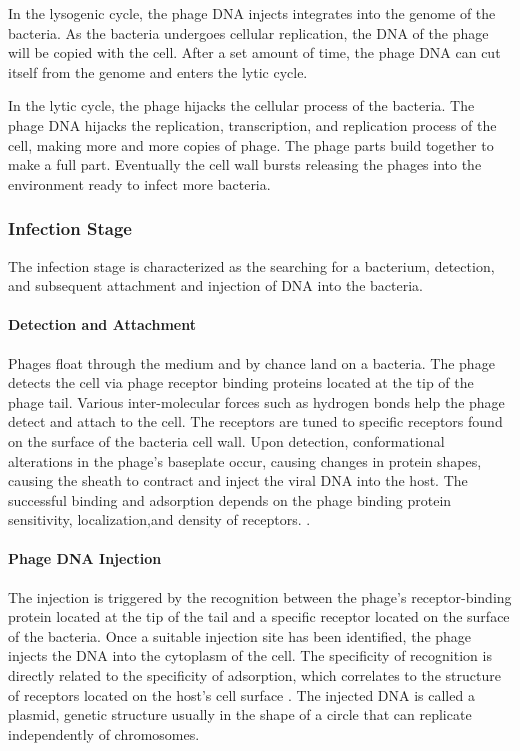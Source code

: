 In the lysogenic cycle, the phage DNA injects integrates into the genome of the bacteria. 
As the bacteria undergoes cellular replication, the DNA of the phage will be copied with the cell. 
After a set amount of time, the phage DNA can cut itself from the genome and enters the lytic cycle.
\newline 

In the lytic cycle, the phage hijacks the cellular process of the bacteria. 
The phage DNA hijacks the replication, transcription, and replication process of the cell, making more and more copies of phage. 
The phage parts build together to make a full part. 
Eventually the cell wall bursts releasing the phages into the environment ready to infect more bacteria. 

\subsubsection{Infection Stage}
The infection stage is characterized as the searching for a bacterium, detection, and subsequent attachment and injection of DNA into the bacteria. 
\paragraph{Detection and Attachment}
Phages float through the medium and by chance land on a bacteria. The phage detects the cell via phage receptor binding proteins located at the tip of the phage tail. 
Various inter-molecular forces such as hydrogen bonds help the phage detect and attach to the cell. 
The receptors are tuned to specific receptors found on the surface of the bacteria cell wall. 
Upon detection, conformational alterations in the phage's baseplate occur, causing changes in protein shapes, causing the sheath to contract and inject the viral DNA into the host. 
The successful binding and adsorption depends on the phage binding protein sensitivity, localization,and density of receptors. \cite{stoneUnderstandingExploitingPhage2019}. 
\paragraph{Phage DNA Injection}
The injection is triggered by the recognition between the phage's receptor-binding protein located at the tip of the tail and a specific receptor located on the surface of the bacteria. 
Once a suitable injection site has been identified, the phage injects the DNA into the cytoplasm of the cell. 
The specificity of recognition is directly related to the specificity of adsorption, which correlates to the structure of receptors located on the host's cell surface \cite{stoneUnderstandingExploitingPhage2019}. 
The injected DNA is called a plasmid, genetic structure usually in the shape of a circle that can replicate independently of chromosomes. 

